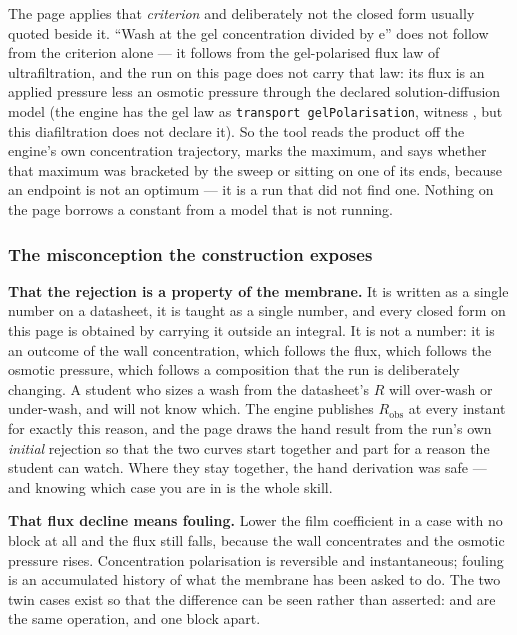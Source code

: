 \documentclass[11pt,a4paper]{article}
\begin{document}
The page applies that \emph{criterion} and deliberately not the closed
form usually quoted beside it.  ``Wash at the gel concentration divided by
$\mathrm{e}$'' does not follow from the criterion alone --- it follows
from the gel-polarised flux law of ultrafiltration, and the run on this
page does not carry that law: its flux is an applied pressure less an
osmotic pressure through the declared solution-diffusion model (the
engine has the gel law as \texttt{transport gelPolarisation}, witness
, but this
diafiltration does not declare it).  So the tool reads the
product off the engine's own concentration trajectory, marks the maximum,
and says whether that maximum was bracketed by the sweep or sitting on one
of its ends, because an endpoint is not an optimum --- it is a run that
did not find one.  Nothing on the page borrows a constant from a model
that is not running.

\subsubsection*{The misconception the construction exposes}

\begin{pitfall}
\textbf{That the rejection is a property of the membrane.}  It is written
as a single number on a datasheet, it is taught as a single number, and
every closed form on this page is obtained by carrying it outside an
integral.  It is not a number: it is an outcome of the wall concentration,
which follows the flux, which follows the osmotic pressure, which follows
a composition that the run is deliberately changing.  A student who sizes
a wash from the datasheet's $R$ will over-wash or under-wash, and will not
know which.  The engine publishes $R_{\mathrm{obs}}$ at every instant for
exactly this reason, and the page draws the hand result from the run's own
\emph{initial} rejection so that the two curves start together and part
for a reason the student can watch.  Where they stay together, the hand
derivation was safe --- and knowing which case you are in is the whole
skill.
\end{pitfall}

\begin{pitfall}
\textbf{That flux decline means fouling.}  Lower the film coefficient in a
case with no  block at all and the flux still falls, because
the wall concentrates and the osmotic pressure rises.  Concentration
polarisation is reversible and instantaneous; fouling is an accumulated
history of what the membrane has been asked to do.  The two twin cases
exist so that the difference can be seen rather than asserted:
 and  are the same operation, and one
block apart.
\end{pitfall}
\end{document}
